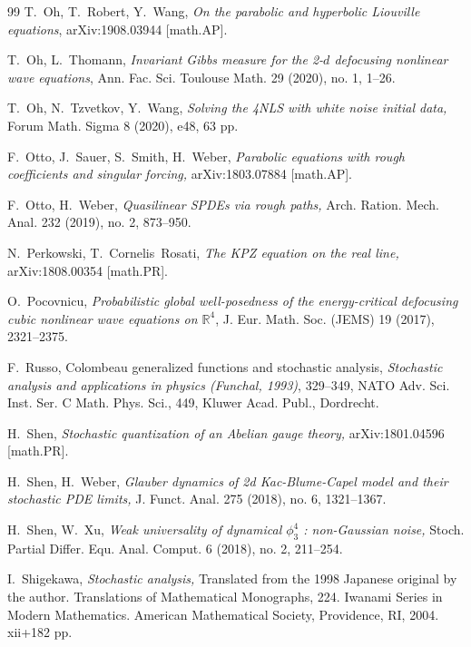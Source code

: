\documentclass[%
11pt,  reqno]{amsart}
\newcommand{\1}{\hspace{0.2mm}\text{I}\hspace{0.2mm}}
\newcommand{\R}{\mathbb{R}}
\numberwithin{equation}{section}
\numberwithin{theorem}{section}
\begin{document}
\begin{thebibliography}{99}
T.~Oh, T.~Robert, Y.~Wang, 
{\it On the parabolic and hyperbolic Liouville equations}, 
arXiv:1908.03944 [math.AP].

T.~Oh, L.~Thomann, 
{\it Invariant Gibbs measure for 
the 2-$d$ defocusing nonlinear wave  equations}, 
Ann. Fac. Sci. Toulouse Math.
 29 (2020), no. 1, 1--26. 

T.~Oh, N.~Tzvetkov, Y.~Wang,
{\it  Solving the 4NLS with white noise initial data,} 
Forum Math. Sigma 8 (2020), e48, 63 pp. 

F.~Otto, J.~Sauer, S.~Smith,  H.~Weber,
{\it Parabolic equations with rough coefficients and singular forcing,}
arXiv:1803.07884 [math.AP].

F.~Otto, H.~Weber,
{\it Quasilinear {SPDEs} via rough paths,}
 Arch. Ration. Mech. Anal. 232 (2019), no. 2, 873--950.

N.~Perkowski, T.~Cornelis~Rosati,
{\it The {KPZ} {equation} on the {real} {line},}
arXiv:1808.00354 [math.PR].


O.~Pocovnicu,
{\it Probabilistic  global well-posedness of the energy-critical defocusing  cubic nonlinear
wave equations on $\R^4$}, 
 J. Eur. Math. Soc. (JEMS) 19 (2017), 2321--2375. 




F.~Russo, 
 Colombeau generalized functions and stochastic analysis,  {\it Stochastic analysis and applications in physics (Funchal, 1993)}, 329--349, NATO Adv. Sci. Inst. Ser. C Math. Phys. Sci., 449, Kluwer Acad. Publ., Dordrecht. 

H.~Shen,
{\it Stochastic quantization of an {Abelian} gauge theory,}
arXiv:1801.04596 [math.PR].


H.~Shen, H.~Weber,
{\it Glauber dynamics of 2d {Kac}-{Blume}-{Capel} model and their
  stochastic {PDE} limits,}
 J. Funct. Anal. 275 (2018), no. 6, 1321--1367.

H.~Shen, W.~Xu,
{\it Weak universality of dynamical $\phi^4_3$ : non-{Gaussian} noise,}
 Stoch. Partial Differ. Equ. Anal. Comput. 6 (2018), no. 2, 211--254. 



I.~Shigekawa, 
{\it Stochastic analysis,}
Translated from the 1998 Japanese original by the author. Translations of Mathematical Monographs, 224. Iwanami Series in Modern Mathematics. American Mathematical Society, Providence, RI, 2004. xii+182 pp.


\end{thebibliography}
\end{document}
